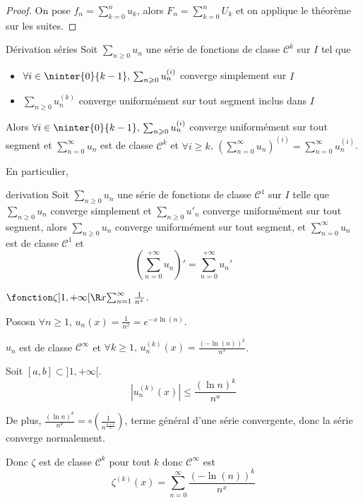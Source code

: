 \begin{proof}
    On pose $\displaystyle f_n = \sum_{k = 0}^n u_k$, alors $\displaystyle F_n = \sum_{k = 0 }^{n } U_k$ et on applique le 
    théorème sur les suites. 
\end{proof}

\begin{theoreme}{Dérivation séries}{}
    Soit $\sum_{n \geqslant 0} u_n$ une série de fonctions de classe $\mathscr{C}^k$ sur $I$ tel que 
    \begin{itemize}
        \item $\forall i \in \ninter{0}{k - 1}, \, \sum_{n \geqslant 0} u_n^{(i)}$ converge simplement sur $I$ 
        \item $\sum_{n \geqslant 0} u_n^{(k)}$ converge uniformément sur tout segment inclus dans $I$   
    \end{itemize}

    Alors $\forall i \in \ninter{0}{k - 1}, \, \sum_{n \geqslant 0} u_n^{(i)}$ converge uniformément sur tout segment
    et $\displaystyle \sum_{n = 0}^{\infty} u_n$ est de classe $\mathscr{C}^k$ et 
    $\forall i \geqslant k$, $\displaystyle \left( \sum_{n = 0}^{\infty} u_n \right)^{(i)} = \sum_{n = 0}^{\infty} u_n^{(i)}$.
\end{theoreme}

En particulier, 

\begin{theoreme}{derivation }{}
    Soit $\sum_{n \geqslant 0} u_n$ une série de fonctions de classe $\mathscr{C}^1$ sur $I$ telle que
    $\sum_{n \geqslant 0} u_n$ converge simplement et $\sum_{n \geqslant 0} u'_n$ converge uniformément sur tout segment, alors 
    $\sum_{n \geqslant 0} u_n$ converge uniformément sur tout segment, et 
    $\displaystyle \sum_{n = 0 }^{\infty } u_n$ est de classe $\mathscr C^1$ et 
    $$\left(\sum_{n = 0}^{+ \infty} u_n\right)' = \sum_{n = 0 }^{+ \infty } u_n'$$
\end{theoreme}

\begin{exemple}
    $\fonction \zeta {]1, + \infty[}{\R} x {\sum_{n = 1}^{\infty} \frac 1 {n^x}}$.

    Pososn $\forall n \geqslant 1, \, u_n(x) = \frac 1 {n^x} = e^{-x \ln(n)}$.

    $u_n$ est de classe $\mathscr {C}^{\infty}$ et $\forall k \geqslant 1, \, u_n^{(k)}(x) = \frac{(- \ln(n))^k}{n^x}$. 

    Soit $[a, b] \subset ]1, +\infty[$.
    $$\left| u_n^{(k)}(x) \right| \leqslant \frac{(\ln n )^k}{n^a}$$

    De plus, $\displaystyle \frac{(\ln n)^k}{n^a} = \circ \left( \frac 1 {n^{\frac{a + 1}{2}}} \right)$, terme 
    général d'une série convergente, donc la série converge normalement. 

    Donc $\zeta$ est de classe $\mathscr{C}^{k}$ pour tout $k$ donc $\mathscr{C}^{\infty}$ est 
    $$\zeta^{(k)}(x) = \sum_{n = 0}^{\infty} \frac{(- \ln(n))^k}{n^x}$$
\end{exemple}

